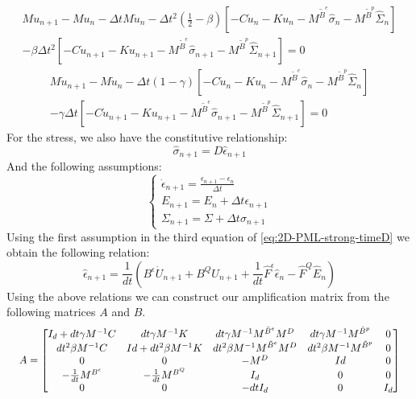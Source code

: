 \begin{align}
		M u_{n+1} - M u_n - \Delta t M \dot{u}_n - \Delta t^2 \left(\frac{1}{2}-\beta\right) \left[ - C \dot{u}_{n} 
-K u_{n} - M^{\tilde{B}^{e}} \hat{\sigma}_{n} - M^{\tilde{B}^{p}}\hat{\Sigma}_{n}\right] \\ - \beta \Delta t^2 \left[-C \dot{u}_{n+1} 
-K u_{n+1} - M^{\tilde{B}^{e}} \hat{\sigma}_{n+1} - M^{\tilde{B}^{p}}\hat{\Sigma}_{n+1}\right] = 0  
\end{align}
\begin{align}
		M \dot{u}_{n+1} - M \dot{u}_n - \Delta t (1-\gamma) \left[ - C \dot{u}_{n} 
-K u_{n} - M^{\tilde{B}^{e}} \hat{\sigma}_{n} - M^{\tilde{B}^{p}}\hat{\Sigma}_{n}\right] \\ - \gamma \Delta t \left[-C \dot{u}_{n+1} 
-K u_{n+1} - M^{\tilde{B}^{e}} \hat{\sigma}_{n+1} - M^{\tilde{B}^{p}}\hat{\Sigma}_{n+1}\right] = 0
\label{eq:3Main-relations-V2}
\end{align}
For the stress, we also have the constitutive relationship:
\begin{equation}
\hat{\sigma}_{n+1} = D \hat{\epsilon}_{n+1}
\end{equation} 
And the following assumptions:
\begin{equation}
\begin{cases}
\dot{\epsilon}_{n+1} = \frac{\epsilon_{n+1}-\epsilon_n}{\Delta t} \\
E_{n+1} = E_n + \Delta t \epsilon_{n+1} \\
\Sigma_{n+1} = \Sigma + \Delta t \sigma_{n+1}
\end{cases}
\end{equation}
Using the first assumption in the third equation of \ref{eq:2D-PML-strong-timeD} we obtain the following relation:
\begin{equation}
\hat{\epsilon}_{n+1} = \frac{1}{dt}\left(B^\epsilon \dot{U}_{n+1} + B^Q U_{n+1} + \frac{1}{dt} \hat{F}^\epsilon \hat{\epsilon}_n - \hat{F}^Q \hat{E}_n\right)
\end{equation}
Using the above relations we can construct our amplification matrix from the following matrices $A$ and $B$.
\begin{equation}
\resizebox{\columnwidth}{!}{
$
A = \begin{bmatrix}
I_d + dt \gamma M^{-1} C & dt \gamma M^{-1} K & dt \gamma M^{-1} M^{\tilde{B}^{e}}M^D& dt \gamma M^{-1} M^{\tilde{B}^{p}} & 0 \\
dt^2 \beta M^{-1} C & Id + dt^2 \beta M^{-1}K & dt^2 \beta M^{-1} M^{\tilde{B}^{e}}M^D & d t^2 \beta M^{-1} M^{\tilde{B}^{p}}  & 0 \\
0 & 0 & -M^D & Id & 0 \\
-\frac{1}{dt} M^{B^\epsilon} & -\frac{1}{dt}M^{B^Q} & I_d & 0 & 0\\
0 & 0 & -dt I_d & 0 & I_d 
\end{bmatrix}
$
}
\label{eq:A}
\end{equation}
